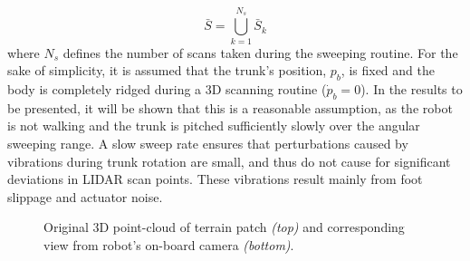 				\begin{equation}
					\bar{S} = \bigcup_{k=1}^{N_{s}} \bar{S}_{k}
					\label{eq::scan_composition}
				\end{equation}
			where $N_{s}$ defines the number of scans taken during the sweeping routine. For the sake of simplicity, it is assumed that the trunk's position, $p_{b}$, is fixed and the body is completely ridged during a 3D scanning routine (\IE $\dot{p}_{b}=0$). In the results to be presented, it will be shown that this is a reasonable assumption, as the robot is not walking and the trunk is pitched sufficiently slowly over the angular sweeping range. A slow sweep rate ensures that perturbations caused by vibrations during trunk rotation are small, and thus do not cause for significant deviations in LIDAR scan points. These vibrations result mainly from foot slippage and actuator noise.
				\begin{figure}[!h]
					\centering
					\caption{Original 3D point-cloud of terrain patch \emph{(top)} and corresponding view from robot's on-board camera \emph{(bottom)}.}
					\label{fig::pointcloud_terrain_patch}
				\end{figure}




